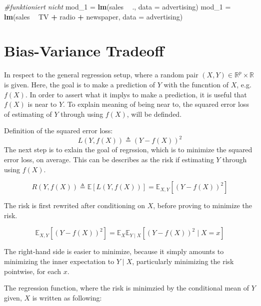 \documentclass[]{report}
\newenvironment{Shaded}{\begin{snugshade}}{\end{snugshade}}
\newcommand{\KeywordTok}[1]{\textcolor[rgb]{0.13,0.29,0.53}{\textbf{#1}}}
\newcommand{\DataTypeTok}[1]{\textcolor[rgb]{0.13,0.29,0.53}{#1}}
\newcommand{\DecValTok}[1]{\textcolor[rgb]{0.00,0.00,0.81}{#1}}
\newcommand{\StringTok}[1]{\textcolor[rgb]{0.31,0.60,0.02}{#1}}
\newcommand{\CommentTok}[1]{\textcolor[rgb]{0.56,0.35,0.01}{\textit{#1}}}
\newcommand{\OperatorTok}[1]{\textcolor[rgb]{0.81,0.36,0.00}{\textbf{#1}}}
\newcommand{\NormalTok}[1]{#1}
\begin{document}
\begin{Shaded}
\begin{Highlighting}[]
\CommentTok{#funktioniert nicht}
\NormalTok{mod_}\DecValTok{1}\NormalTok{ =}\StringTok{ }\KeywordTok{lm}\NormalTok{(sales }\OperatorTok{~}\StringTok{ }\NormalTok{., }\DataTypeTok{data =}\NormalTok{ advertising)}
\NormalTok{mod_}\DecValTok{1}\NormalTok{ =}\StringTok{ }\KeywordTok{lm}\NormalTok{(sales }\OperatorTok{~}\StringTok{ }\NormalTok{TV }\OperatorTok{+}\StringTok{ }\NormalTok{radio }\OperatorTok{+}\StringTok{ }\NormalTok{newspaper, }\DataTypeTok{data =}\NormalTok{ advertising)}
\end{Highlighting}
\end{Shaded}

\chapter{Bias-Variance Tradeoff}\label{bias-variance-tradeoff}

In respect to the general regression setup, where a random pair
\((X, Y) \in \mathbb{R}^p \times \mathbb{R}\) is given. Here, the goal
is to make a prediction of \(Y\) with the funcntion of \(X\), e.g.
\(f(X)\). In order to assert what it implys to make a prediction, it is
useful that \(f(X)\) is near to \(Y\). To explain meaning of being near
to, the squared error loss of estimating of \(Y\) through using
\(f(X)\), will be definded.

Definition of the squared error loss: \[
L(Y, f(X)) \triangleq (Y - f(X)) ^ 2
\] The next step is to exlain the goal of regrssion, which is to
minimize the squared error loss, on average. This can be describes as
the risk if estimating \(Y\) through using \(f(X)\).

\[
R(Y, f(X)) \triangleq \mathbb{E}[L(Y, f(X))] = \mathbb{E}_{X, Y}[(Y - f(X)) ^ 2]
\]

The risk is first rewrited after conditioning on \(X\), before proving
to minimize the risk.

\[
\mathbb{E}_{X, Y} \left[ (Y - f(X)) ^ 2 \right] = \mathbb{E}_{X} \mathbb{E}_{Y \mid X} \left[ ( Y - f(X) ) ^ 2 \mid X = x \right]
\]

The right-hand side is easier to minimize, because it simply amounts to
minimizing the inner expectation to \(Y \mid X\), particularly
minimizing the risk pointwise, for each \(x\).

The regression function, where the risk is minimzied by the conditional
mean of \(Y\) given, \(X\) is written as following:
\end{document}
